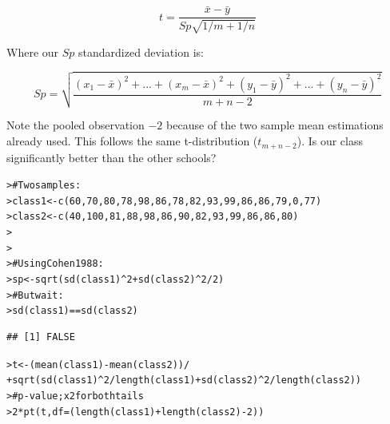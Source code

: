 \documentclass[12pt]{article}\usepackage[]{graphicx}\usepackage[]{color}
\makeatletter
\newcommand{\hlnum}[1]{\textcolor[rgb]{0.82,0.78,0.62}{#1}}%
\newcommand{\hlcom}[1]{\textcolor[rgb]{0.404,0.408,0.42}{#1}}%
\newcommand{\hlopt}[1]{\textcolor[rgb]{0.882,0.878,0.898}{#1}}%
\newcommand{\hlstd}[1]{\textcolor[rgb]{0.882,0.878,0.898}{#1}}%
\newcommand{\hlkwb}[1]{\textcolor[rgb]{0.902,0.675,0.196}{#1}}%
\newcommand{\hlkwc}[1]{\textcolor[rgb]{0.812,0.522,0.388}{#1}}%
\newcommand{\hlkwd}[1]{\textcolor[rgb]{0.733,0.388,0.812}{#1}}%
\newenvironment{kframe}{%
 \def\at@end@of@kframe{}%
 \ifinner\ifhmode%
  \def\at@end@of@kframe{\end{minipage}}%
  \begin{minipage}{\columnwidth}%
 \fi\fi%
 \def\FrameCommand##1{\hskip\@totalleftmargin \hskip-\fboxsep
 \colorbox{shadecolor}{##1}\hskip-\fboxsep
     \hskip-\linewidth \hskip-\@totalleftmargin \hskip\columnwidth}%
 \MakeFramed {\advance\hsize-\width
   \@totalleftmargin\z@ \linewidth\hsize
   \@setminipage}}%
 {\par\unskip\endMakeFramed%
 \at@end@of@kframe}
\newenvironment{knitrout}{}{} %
\makeatother
\begin{document}
\begin{flushleft}
$$ t = \frac{\bar{x}-\bar{y}}{Sp \sqrt{1/m + 1/n}} $$

Where our $Sp$ standardized deviation is:

$$ Sp = \sqrt{ \frac{ (x_1 - \bar{x})^2 + \text{...} + (x_m - \bar{x})^2 + (y_1 - \bar{y})^2 + \text{...} + (y_n - \bar{y})^2  }{m+n -2}} $$

Note the pooled observation $-2$ because of the two sample mean estimations already used. This follows the same t-distribution ($t_{m+n-2}$). Is our class significantly better than the other schools?

\begin{knitrout}
\color{fgcolor}\begin{kframe}
\begin{alltt}
\hlstd{> }\hlcom{# Two samples:}
\hlstd{> }\hlstd{class1} \hlkwb{<-} \hlkwd{c}\hlstd{(}\hlnum{60}\hlstd{,}\hlnum{70}\hlstd{,}\hlnum{80}\hlstd{,}\hlnum{78}\hlstd{,}\hlnum{98}\hlstd{,}\hlnum{86}\hlstd{,}\hlnum{78}\hlstd{,}\hlnum{82}\hlstd{,}\hlnum{93}\hlstd{,}\hlnum{99}\hlstd{,}\hlnum{86}\hlstd{,}\hlnum{86}\hlstd{,}\hlnum{79}\hlstd{,}\hlnum{0}\hlstd{,}\hlnum{77}\hlstd{)}
\hlstd{> }\hlstd{class2} \hlkwb{<-} \hlkwd{c}\hlstd{(}\hlnum{40}\hlstd{,}\hlnum{100}\hlstd{,}\hlnum{81}\hlstd{,}\hlnum{88}\hlstd{,}\hlnum{98}\hlstd{,}\hlnum{86}\hlstd{,}\hlnum{90}\hlstd{,}\hlnum{82}\hlstd{,}\hlnum{93}\hlstd{,}\hlnum{99}\hlstd{,}\hlnum{86}\hlstd{,}\hlnum{86}\hlstd{,}\hlnum{80}\hlstd{)}
\hlstd{> }
\hlstd{> }
\hlstd{> }\hlcom{# Using Cohen 1988:}
\hlstd{> }\hlstd{sp} \hlkwb{<-} \hlkwd{sqrt}\hlstd{(} \hlkwd{sd}\hlstd{(class1)}\hlopt{^}\hlnum{2} \hlopt{+} \hlkwd{sd}\hlstd{(class2)}\hlopt{^}\hlnum{2} \hlopt{/} \hlnum{2}\hlstd{)}
\hlstd{> }\hlcom{# But wait:}
\hlstd{> }\hlkwd{sd}\hlstd{(class1)} \hlopt{==} \hlkwd{sd}\hlstd{(class2)}
\end{alltt}
\begin{verbatim}
## [1] FALSE
\end{verbatim}
\begin{alltt}
\hlstd{> }\hlstd{t} \hlkwb{<-} \hlstd{(}\hlkwd{mean}\hlstd{(class1)} \hlopt{-} \hlkwd{mean}\hlstd{(class2))} \hlopt{/}
\hlstd{+ }     \hlkwd{sqrt}\hlstd{(} \hlkwd{sd}\hlstd{(class1)}\hlopt{^}\hlnum{2}\hlopt{/}\hlkwd{length}\hlstd{(class1)} \hlopt{+} \hlkwd{sd}\hlstd{(class2)}\hlopt{^}\hlnum{2}\hlopt{/}\hlkwd{length}\hlstd{(class2))}
\hlstd{> }\hlcom{# p-value; x2 for both tails}
\hlstd{> }\hlnum{2}\hlopt{*}\hlkwd{pt}\hlstd{(t,} \hlkwc{df} \hlstd{= (}\hlkwd{length}\hlstd{(class1)} \hlopt{+} \hlkwd{length}\hlstd{(class2)} \hlopt{-} \hlnum{2}\hlstd{) )}

\end{alltt}
\end{kframe}
\end{knitrout}
\end{flushleft}
\end{document}
